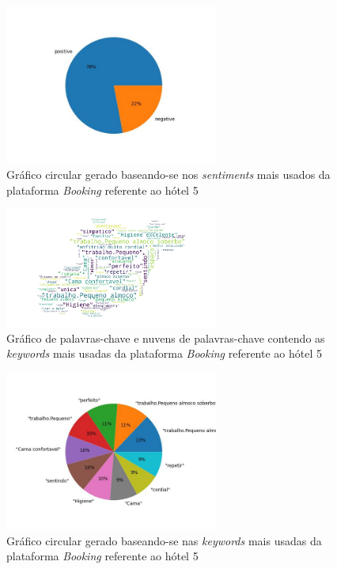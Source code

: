 \begin{figure}[!htb]
\centering
\includegraphics[width=7cm]{figuras/Booking/hotel5_sentiments.jpeg}
\caption{Gráfico circular gerado baseando-se nos \textit{sentiments} mais usados da plataforma \textit{Booking} referente ao hótel 5}
\label{fig:exemplofig}
\end{figure}

\begin{figure}[!htb]
\centering
\includegraphics[width=7cm]{figuras/Booking/hotel5_keywordcloud.jpeg}
\caption{Gráfico de palavras-chave e nuvens de palavras-chave contendo as \textit{keywords} mais usadas da plataforma \textit{Booking} referente ao hótel 5}
\label{fig:exemplofig}
\end{figure}

\begin{figure}[!htb]
\centering
\includegraphics[width=7cm]{figuras/Booking/hotel5_keywords.jpeg}
\caption{Gráfico circular gerado baseando-se nas \textit{keywords} mais usadas da plataforma \textit{Booking} referente ao hótel 5}
\label{fig:exemplofig}
\end{figure}

